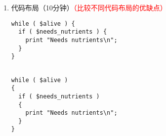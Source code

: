 \documentclass{TIJMUjiaoanLL}
\begin{document}
\begin{enumerate}
\begin{enumerate}
\begin{enumerate}
\begin{itemize}
	      \item Perl程序5.1：使用if-elsif-else
	    \end{itemize}
\vspace{-1em}
\begin{multicols}{2}
\begin{verbatim}
if( 1 == 1 ) {
print "1 equals 1\n";
}
if( 1 ) {
print "1 evaluates to true\n";
}
\end{verbatim}
\begin{verbatim}
if( 1 == 0 ) {
print "1 equals 0\n";
}
if( 0 ) {
print "0 evaluates to true\n";
}
\end{verbatim}
\end{multicols}
\vspace{-1em}
	  \item 循环：一直重复语句，直到相应的测试失败为止；while、for、foreach
	    \begin{itemize}
	      \item Perl程序5.2：使用while从文件中读取蛋白质序列数据
	    \end{itemize}
	\end{enumerate}
      \item \textcolor{red}{【重点、难点】}真和假
	\begin{enumerate}
	  \item 数字：0为假，其他为真
	  \item 字符串：空字符串和字符串\verb|'0'|\textcolor{red}{（唯一为假的非空字符串）}为假，其他为真
	  \item 其他：先转换成数字或字符串再行判断
	\end{enumerate}
    \end{enumerate}
  \item 代码布局（10分钟）\textcolor{red}{（比较不同代码布局的优缺点）}
\vspace{-1em}
\begin{multicols}{2}
\begin{verbatim}
while ( $alive ) {
  if ( $needs_nutrients ) {
    print "Needs nutrients\n";
  }
}


\end{verbatim}
\begin{verbatim}
while ( $alive )
{
  if ( $needs_nutrients )
  {
    print "Needs nutrients\n";
  }
}
\end{verbatim}
\end{multicols}
\vspace{-1em}

\otherTail
\newpage
\otherHeader


\end{enumerate}
\end{document}
